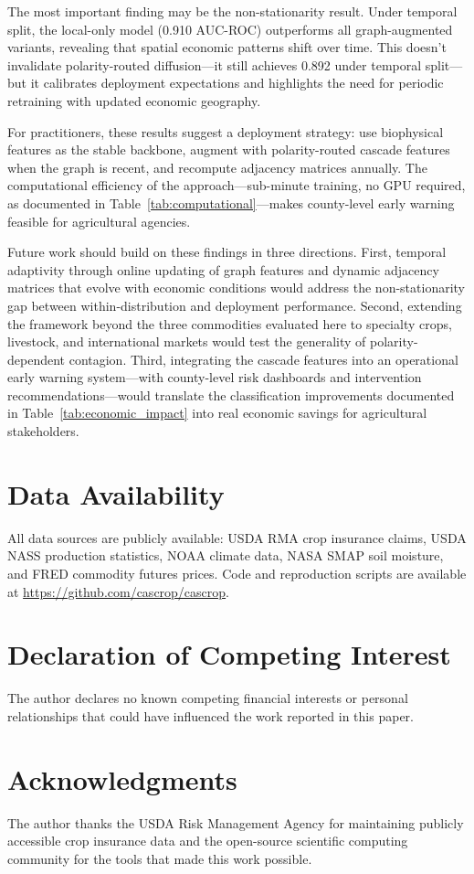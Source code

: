 \documentclass[preprint,12pt,authoryear]{elsarticle}
\begin{document}
The most important finding may be the non-stationarity result. Under temporal split, the local-only model (0.910 AUC-ROC) outperforms all graph-augmented variants, revealing that spatial economic patterns shift over time. This doesn't invalidate polarity-routed diffusion---it still achieves 0.892 under temporal split---but it calibrates deployment expectations and highlights the need for periodic retraining with updated economic geography.

For practitioners, these results suggest a deployment strategy: use biophysical features as the stable backbone, augment with polarity-routed cascade features when the graph is recent, and recompute adjacency matrices annually. The computational efficiency of the approach---sub-minute training, no GPU required, as documented in Table~\ref{tab:computational}---makes county-level early warning feasible for agricultural agencies.

Future work should build on these findings in three directions. First, temporal adaptivity through online updating of graph features and dynamic adjacency matrices that evolve with economic conditions would address the non-stationarity gap between within-distribution and deployment performance. Second, extending the framework beyond the three commodities evaluated here to specialty crops, livestock, and international markets would test the generality of polarity-dependent contagion. Third, integrating the cascade features into an operational early warning system---with county-level risk dashboards and intervention recommendations---would translate the classification improvements documented in Table~\ref{tab:economic_impact} into real economic savings for agricultural stakeholders.

\section*{Data Availability}

All data sources are publicly available: USDA RMA crop insurance claims, USDA NASS production statistics, NOAA climate data, NASA SMAP soil moisture, and FRED commodity futures prices. Code and reproduction scripts are available at \url{https://github.com/cascrop/cascrop}.

\section*{Declaration of Competing Interest}

The author declares no known competing financial interests or personal relationships that could have influenced the work reported in this paper.

\section*{Acknowledgments}

The author thanks the USDA Risk Management Agency for maintaining publicly accessible crop insurance data and the open-source scientific computing community for the tools that made this work possible.



\end{document}

